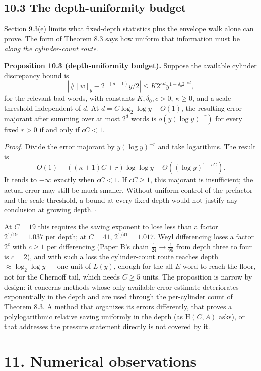 \documentclass[11pt,a4paper]{article}
\begin{document}
\subsection{10.3 The depth-uniformity
budget}\label{the-depth-uniformity-budget}

Section 9.3(e) limits what fixed-depth statistics plus the envelope walk
alone can prove. The form of Theorem 8.3 says how uniform that
information must be \emph{along the cylinder-count route}.

\textbf{Proposition 10.3 (depth-uniformity budget).} Suppose the
available cylinder discrepancy bound is \[
\left|\#[w]_y-2^{-(d-1)}y/2\right|
 \le K2^{\kappa d}y^{1-\delta_0 2^{-cd}},
\] for the relevant bad words, with constants \(K,\delta_0,c>0\),
\(\kappa\ge0\), and a scale threshold independent of \(d\). At
\(d=C\log_2\log y+O(1)\), the resulting error majorant after summing
over at most \(2^d\) words is \(o(y(\log y)^{-r})\) for every fixed
\(r>0\) if and only if \(cC<1\).

\emph{Proof.} Divide the error majorant by \(y(\log y)^{-r}\) and take
logarithms. The result is \[
O(1)+((\kappa+1)C+r)\log\log y
 -\Theta((\log y)^{1-cC}).
\] It tends to \(-\infty\) exactly when \(cC<1\). If \(cC\ge1\), this
majorant is insufficient; the actual error may still be much smaller.
Without uniform control of the prefactor and the scale threshold, a
bound at every fixed depth would not justify any conclusion at growing
depth. \(\square\)

At \(C=19\) this requires the saving exponent to lose less than a factor
\(2^{1/19}=1.037\) per depth; at \(C=41\), \(2^{1/41}=1.017\). Weyl
differencing loses a factor \(2^{c}\) with \(c\ge1\) per differencing
(Paper B's chain \(\tfrac1{24}\to\tfrac1{96}\) from depth three to four
is \(c=2\)), and with such a loss the cylinder-count route reaches depth
\(\approx\log_2\log y\) --- one unit of \(L(y)\), enough for the
all-\(E\) word to reach the floor, not for the Chernoff tail, which
needs \(C\ge 5\) units. The proposition is narrow by design: it concerns
methods whose only available error estimate deteriorates exponentially
in the depth and are used through the per-cylinder count of Theorem 8.3.
A method that organizes its errors differently, that proves a
polylogarithmic relative saving uniformly in the depth (as
\(\mathrm H(C,A)\) asks), or that addresses the pressure statement
directly is not covered by it.

\section{11. Numerical observations}\label{numerical-observations}
\end{document}

